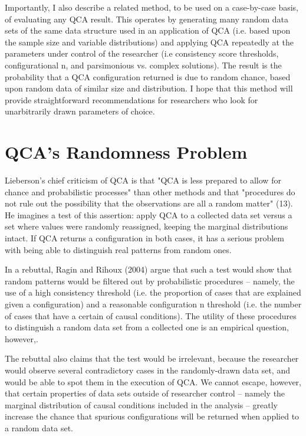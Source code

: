 \documentclass[]{article}
\begin{document}
Importantly, I also describe a related method, to be used on a case-by-case basis, of evaluating any QCA result. This operates by generating many random data sets of the same data structure used in an application of QCA (i.e. based upon the sample size and variable distributions) and applying QCA repeatedly at the parameters under control of the researcher (i.e consistency score thresholds, configurational n, and parsimonious vs. complex solutions). The result is the probability that a QCA configuration returned is due to random chance, based upon random data of similar size and distribution. I hope that this method will provide straightforward recommendations for researchers who look for unarbitrarily drawn parameters of choice. 


\section{QCA's Randomness Problem}


Lieberson's chief criticism of QCA is that "QCA is less prepared to allow for chance and probabilistic processes" than other methods and that "procedures do not rule out the possibility that the observations are all a random matter" (13). He imagines a test of this assertion: apply QCA to a collected data set versus a set where values were randomly reassigned, keeping the marginal distributions intact. If QCA returns a configuration in both cases, it has a serious problem with being able to distinguish real patterns from random ones. 

In a rebuttal, Ragin and Rihoux (2004) argue that such a test would show that random patterns would be filtered out by probabilistic procedures -- namely, the use of a high consistency threshold (i.e. the proportion of cases that are explained given a configuration) and a reasonable configuration n threshold (i.e. the number of cases that have a certain of causal conditions). The utility of these procedures to distinguish a random data set from a collected one is an empirical question, however,. 

The rebuttal also claims that the test would be irrelevant, because the researcher would observe several contradictory cases in the randomly-drawn data set, and would be able to spot them in the execution of QCA. We cannot escape, however, that certain properties of data sets outside of researcher control -- namely the marginal distribution of causal conditions included in the analysis -- greatly increase the chance that spurious configurations will be returned when applied to a random data set. 
\end{document}
